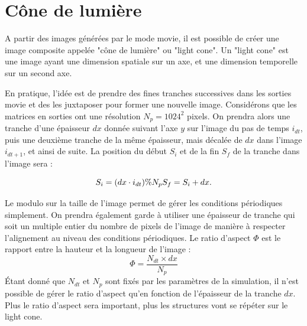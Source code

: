\section{Cône de lumière}

A partir des images générées par le mode movie, il est possible de créer une image composite appelée "cône de lumière" ou "light cone".
Un "light cone" est une image ayant une dimension spatiale sur un axe, et une dimension temporelle sur un second axe.


En pratique, l'idée est de prendre des fines tranches successives dans les sorties movie et des les juxtaposer pour former une nouvelle image.
Considérons que les matrices en sorties ont une résolution $N_p=1024^2$ pixels.
On prendra alors une tranche d'une épaisseur $dx$ donnée suivant l'axe $y$ sur l'image du pas de temps $i_{dt}$, puis une deuxième tranche de la même épaisseur, mais décalée de $dx$ dans l'image $i_{dt+1}$, et ainsi de suite.
La position du début $S_i$ et de la fin $S_f$ de la tranche dans l'image sera :

\begin{equation}
S_i = (dx \cdot i_{dt}) \% N_p \\
S_f = S_i + dx .
\end{equation} 

Le modulo sur la taille de l'image permet de gérer les conditions périodiques simplement.
On prendra également garde à utiliser une épaisseur de tranche qui soit un multiple entier du nombre de pixels de l'image de manière à respecter l’alignement au niveau des conditions périodiques.
Le ratio d'aspect $\Phi$ est le rapport entre la hauteur et la longueur de l'image :
\begin{equation}
\Phi = \frac{ N_{dt} \times dx}{N_p}
\end{equation}
Étant donné que $N_{dt}$ et $N_p$ sont fixés par les paramètres de la simulation, il n'est possible de gérer le ratio d'aspect qu'en fonction de l'épaisseur de la tranche $dx$.
Plus le ratio d'aspect sera important, plus les structures vont se répéter sur le light cone.

